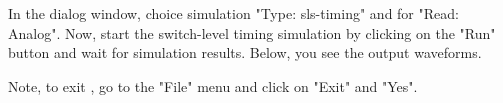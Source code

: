 \begin{figure}[h]
\centerline{}
\end{figure}

\noindent
In the dialog window, choice simulation "Type: sls-timing" and for "Read: Analog".
Now, start the switch-level timing simulation by clicking on the "Run" button and wait for simulation results.
Below, you see the output waveforms.

\begin{figure}[h]
\centerline{}
\end{figure}

Note, to exit ,
go to the "File" menu and click on "Exit" and "Yes".
